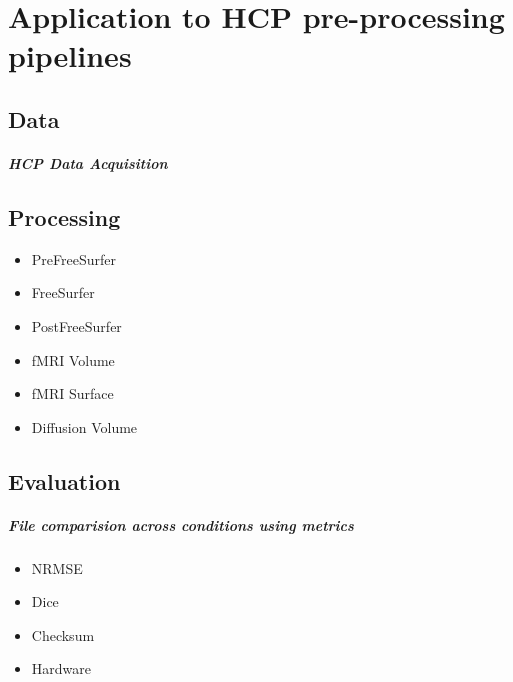 \chapter{Application to HCP pre-processing pipelines}

\section{Data}
\paragraph{HCP Data Acquisition}

\section{Processing}
\begin{itemize}
  \item PreFreeSurfer
  \item FreeSurfer
  \item PostFreeSurfer
  \item fMRI Volume
  \item fMRI Surface
  \item Diffusion Volume
\end{itemize}

\section{Evaluation}
\paragraph{File comparision across conditions using metrics}
\begin{itemize}
  \item NRMSE
  \item Dice
  \item Checksum
  \item Hardware
\end{itemize}
